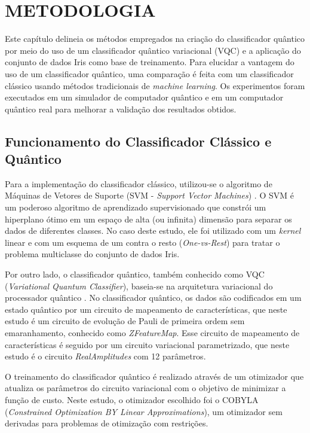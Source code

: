 \chapter{METODOLOGIA} \label{chap_metodologia}

Este capítulo delineia os métodos empregados na criação do classificador quântico por meio do uso de um classificador quântico variacional (VQC) e a aplicação do conjunto de dados Iris como base de treinamento. Para elucidar a vantagem do uso de um classificador quântico, uma comparação é feita com um classificador clássico usando métodos tradicionais de \textit{machine learning}. Os experimentos foram executados em um simulador de computador quântico e em um computador quântico real para melhorar a validação dos resultados obtidos.

\section{Funcionamento do Classificador Clássico e Quântico}

Para a implementação do classificador clássico, utilizou-se o algoritmo de Máquinas de Vetores de Suporte (SVM - \textit{Support Vector Machines}) \cite{Zhou2018HandwrittenDigitRecognition}. O SVM é um poderoso algoritmo de aprendizado supervisionado que constrói um hiperplano ótimo em um espaço de alta (ou infinita) dimensão para separar os dados de diferentes classes. No caso deste estudo, ele foi utilizado com um \textit{kernel} linear e com um esquema de um contra o resto (\textit{One-vs-Rest}) para tratar o problema multiclasse do conjunto de dados Iris.

Por outro lado, o classificador quântico, também conhecido como VQC (\textit{Variational Quantum Classifier}), baseia-se na arquitetura variacional do processador quântico \cite{Havlicek2019qSupervisedLearning}. No classificador quântico, os dados são codificados em um estado quântico por um circuito de mapeamento de características, que neste estudo é um circuito de evolução de Pauli de primeira ordem sem emaranhamento, conhecido como \textit{ZFeatureMap}. Esse circuito de mapeamento de características é seguido por um circuito variacional parametrizado, que neste estudo é o circuito \textit{RealAmplitudes} com 12 parâmetros.

O treinamento do classificador quântico é realizado através de um otimizador que atualiza os parâmetros do circuito variacional com o objetivo de minimizar a função de custo. Neste estudo, o otimizador escolhido foi o COBYLA (\textit{Constrained Optimization BY Linear Approximations}), um otimizador sem derivadas para problemas de otimização com restrições.

